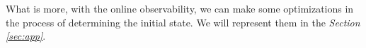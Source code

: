 What is more, with the online observability, we can make some optimizations in the process of determining the initial state. We will represent them in the {\em Section \ref{sec:app}}.
   
   
